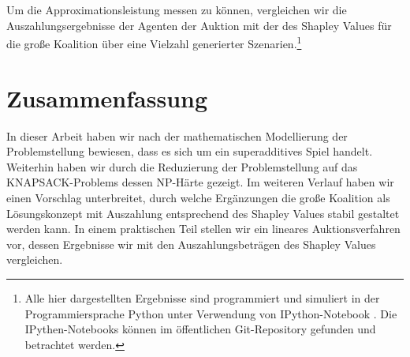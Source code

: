 \documentclass[sigconf]{acmart}
\theoremstyle{break}
\begin{document}
Um die Approximationsleistung messen zu können, vergleichen wir die Auszahlungsergebnisse der Agenten der Auktion mit der des Shapley Values für die große Koalition über eine Vielzahl generierter Szenarien.\footnote{Alle hier dargestellten Ergebnisse sind programmiert und simuliert in der Programmiersprache Python unter Verwendung von IPython-Notebook \cite{PER-GRA:2007}. Die IPythen-Notebooks können im öffentlichen Git-Repository \cite{git} gefunden und betrachtet werden.} 


\section{Zusammenfassung}
  In dieser Arbeit haben wir nach der mathematischen Modellierung der Problemstellung bewiesen, dass es sich um ein superadditives Spiel handelt. Weiterhin haben wir durch die Reduzierung der Problemstellung auf das KNAPSACK-Problems dessen NP-Härte gezeigt.
  Im weiteren Verlauf haben wir einen Vorschlag unterbreitet, durch welche Ergänzungen die große Koalition als Lösungskonzept mit Auszahlung entsprechend des Shapley Values stabil gestaltet werden kann.
  In einem praktischen Teil stellen wir ein lineares Auktionsverfahren vor, dessen Ergebnisse wir mit den Auszahlungsbeträgen des Shapley Values vergleichen.



\end{document}

